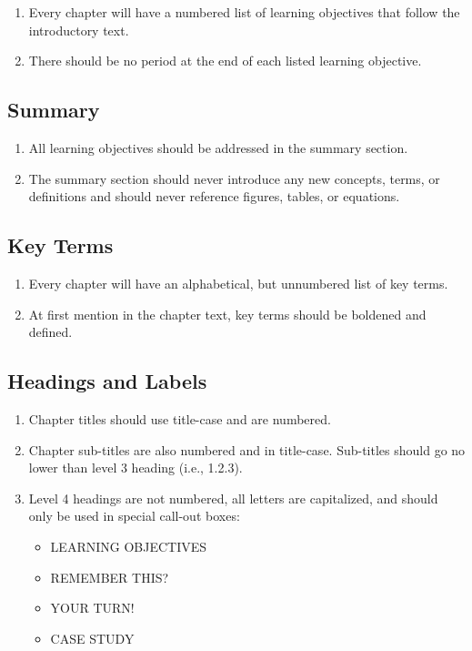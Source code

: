 \documentclass[
]{book}
\providecommand{\tightlist}{%
  \setlength{\itemsep}{0pt}\setlength{\parskip}{0pt}}
\begin{document}
\begin{enumerate}
\def\labelenumi{\arabic{enumi}.}
\tightlist
\item
  Every chapter will have a numbered list of learning objectives that follow the introductory text.
\item
  There should be no period at the end of each listed learning objective.
\end{enumerate}

\hypertarget{summary}{%
\subsection{Summary}\label{summary}}

\begin{enumerate}
\def\labelenumi{\arabic{enumi}.}
\tightlist
\item
  All learning objectives should be addressed in the summary section.
\item
  The summary section should never introduce any new concepts, terms, or definitions and should never reference figures, tables, or equations.
\end{enumerate}

\hypertarget{key-terms}{%
\subsection{Key Terms}\label{key-terms}}

\begin{enumerate}
\def\labelenumi{\arabic{enumi}.}
\tightlist
\item
  Every chapter will have an alphabetical, but unnumbered list of key terms.
\item
  At first mention in the chapter text, key terms should be boldened and defined.
\end{enumerate}

\hypertarget{headings-and-labels}{%
\subsection{Headings and Labels}\label{headings-and-labels}}

\begin{enumerate}
\def\labelenumi{\arabic{enumi}.}
\tightlist
\item
  Chapter titles should use title-case and are numbered.
\item
  Chapter sub-titles are also numbered and in title-case. Sub-titles should go no lower than level 3 heading (i.e., 1.2.3).
\item
  Level 4 headings are not numbered, all letters are capitalized, and should only be used in special call-out boxes:

  \begin{itemize}
  \tightlist
  \item
    LEARNING OBJECTIVES
  \item
    REMEMBER THIS?
  \item
    YOUR TURN!
  \item
    CASE STUDY
  \end{itemize}
\end{enumerate}
\end{document}
